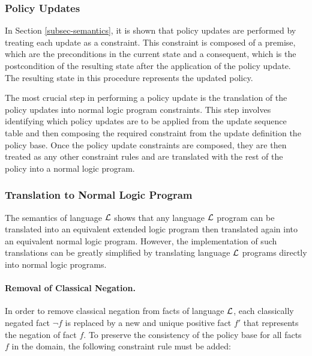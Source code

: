 \documentclass[11pt, twocolumn]{article}
\begin{document}
      \subsubsection{Policy Updates}

        In Section \ref{subsec-semantics}, it is shown that policy updates are
        performed by treating each update as a constraint. This constraint is
        composed of a premise, which are the preconditions in the current state
        and a consequent, which is the postcondition of the resulting state
        after the application of the policy update. The resulting state in this
        procedure represents the updated policy.

        The most crucial step in performing a policy update is the translation
        of the policy updates into normal logic program constraints. This step
        involves identifying which policy updates are to be applied from the
        update sequence table and then composing the required constraint from
        the update definition the policy base. Once the policy update
        constraints are composed, they are then treated as any other
        constraint rules and are translated with the rest of the policy into
        a normal logic program.

      \subsubsection{Translation to Normal Logic Program}

        The semantics of language ${\cal L}$ shows that any language
        ${\cal L}$ program can be translated into an equivalent extended logic
        program then translated again into an equivalent normal logic program.
        However, the implementation of such translations can be greatly
        simplified by translating language ${\cal L}$ programs directly into
        normal logic programs.

        \paragraph{Removal of Classical Negation.}

          In order to remove classical negation from facts of language
          ${\cal L}$, each classically negated fact $\lnot$$f$ is replaced by
          a new and unique positive fact $f'$ that represents the negation of
          fact $f$. To preserve the consistency of the policy base for all
          facts $f$ in the domain, the following constraint rule must be added:
\end{document}
